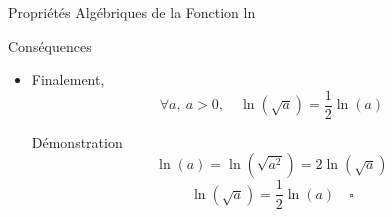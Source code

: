 \documentclass{cours}
\begin{document}
\begin{Gpartie}{Propriétés Algébriques de la Fonction ln}
\begin{Spartie}{Conséquences}
\begin{itemize}
                \[\forall a\in\big]0\,;+\infty\big[,\ \forall n\in\mathbb{Z},\ \ln(a^n)=n\ln(a)\]
                \begin{SSpartie}{Démonstration}
                    \begin{itemize}
                        \item Dans le cas où $n$ est positif, c'est le cas particulier :
                        \[\ln(a_1a_2\dotsb a_n)=\ln(a_1)+\ln(a_2)+\dotsb+\ln(a_n)\]
                        \[a_1=a_2=\dotsb=a_n=a\]
                        \[\ln(a^n)=\ln(a)+\ln(a)+\dotsb+\ln(a)=n\ln(a)\quad\square\]
                        \item Dans le cas où $n$ est négatif, on prend $m=-n$
                        \[\ln(a^n)=\ln(a^{-m})=\ln\left(\frac{1}{a^m}\right)=-\ln(a^m)=-m\ln(a)=n\ln(a)\quad\square\]
                    \end{itemize}
                \end{SSpartie}
                \item Finalement, 
                \[\forall a,\ a>0,\quad\ln\left(\sqrt{a}\right)=\frac{1}{2}\ln(a)\]
                \begin{SSpartie}{Démonstration}
                    \[\ln(a)=\ln\left(\sqrt{a^2}\right)=2\ln\left(\sqrt{a}\right)\]
                    \[\ln\left(\sqrt{a}\right)=\frac{1}{2}\ln(a)\quad\square\]

                \end{SSpartie}
            \end{itemize}
        \end{Spartie}
    \end{Gpartie}
\end{document}
